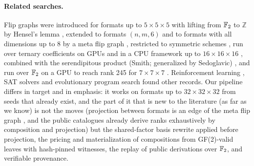 \paragraph{Related searches.}
Flip graphs were introduced for formats up to $5\times5\times5$ with lifting from ${\mathbb{F}_2}$ to $\mathbb Z$ by Hensel's lemma \cite{kauers2023flip},
extended to formats $(n,m,6)$ \cite{kauers2025six} and to formats with all dimensions up to 8 by a meta flip graph
\cite{kauers2025meta}, restricted to symmetric schemes \cite{moosbauer2025flip}, run over ternary coefficients on GPUs
\cite{perminov2025ternary} and in a CPU framework up to $16\times16\times16$ \cite{perminov2026framework}, combined with the serendipitous product (Smith; generalized by Sedoglavic)
\cite{perminov2026serendipitous}, and run over ${\mathbb{F}_2}$ on a GPU to reach rank 245 for $7\times7\times7$ \cite{medley2026gpu}.
Reinforcement learning \cite{fawzi2022discovering}, SAT solvers \cite{heule2019local,heule2021new} and evolutionary program search
\cite{novikov2025alphaevolve} found other records.
Our pipeline differs in target and in emphasis: it works on formats up to $32\times32\times32$ from seeds that already exist, and the
part of it that is new to the literature (as far as we know) is not the moves (projection between formats is an edge of the meta flip graph \cite{kauers2025meta}, and the public catalogues \cite{sedoglavic2026catalogue,lacelle2026catalog} already derive ranks exhaustively by composition and projection) but the shared-factor basis rewrite applied before projection, the pricing and materialization of compositions from GF(2)-valid leaves with hash-pinned witnesses, the replay of public derivations over ${\mathbb{F}_2}$, and verifiable provenance.
